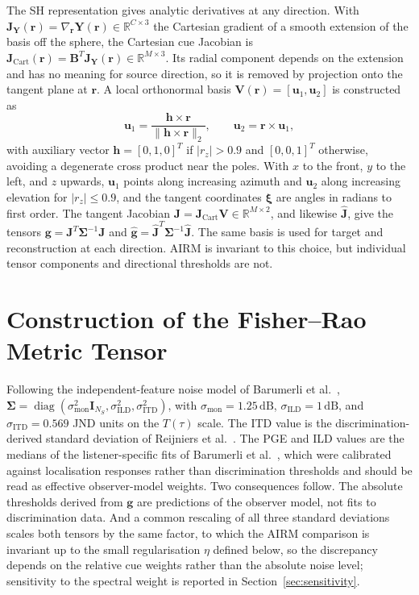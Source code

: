 \documentclass[journal]{IEEEtran}
\begin{document}
The SH representation gives analytic derivatives at any direction. With \(\mathbf{J}_{\mathbf{Y}}(\mathbf{r})=\nabla_{\mathbf{r}}\mathbf{Y}(\mathbf{r})\in \mathbb{R}^{C\times 3}\) the Cartesian gradient of a smooth extension of the basis off the sphere, the Cartesian cue Jacobian is \(\mathbf{J}_{\mathrm{Cart}}(\mathbf{r})=\mathbf{B}^{T}\mathbf{J}_{\mathbf{Y}}(\mathbf{r})\in\mathbb{R}^{M\times3}\). Its radial component depends on the extension and has no meaning for source direction, so it is removed by projection onto the tangent plane at \(\mathbf r\). A local orthonormal basis \(\mathbf{V}(\mathbf{r})=[\mathbf{u}_1,\mathbf{u}_2]\) is constructed as
\begin{equation}
\mathbf{u}_1 = \frac{\mathbf{h}\times \mathbf{r}}{\|\mathbf{h}\times \mathbf{r}\|_2},
\qquad
\mathbf{u}_2 = \mathbf{r} \times \mathbf{u}_1,
\end{equation}
with auxiliary vector \(\mathbf{h} = [0,1,0]^T\) if \(|r_z| > 0.9\) and \([0,0,1]^T\) otherwise, avoiding a degenerate cross product near the poles. With \(x\) to the front, \(y\) to the left, and \(z\) upwards, \(\mathbf u_1\) points along increasing azimuth and \(\mathbf u_2\) along increasing elevation for \(|r_z|\le0.9\), and the tangent coordinates \(\boldsymbol\xi\) are angles in radians to first order. The tangent Jacobian \(\mathbf{J}=\mathbf{J}_{\mathrm{Cart}}\mathbf{V}\in \mathbb{R}^{M\times2}\), and likewise \(\widehat{\mathbf J}\), give the tensors \(\mathbf g=\mathbf J^T\boldsymbol\Sigma^{-1}\mathbf J\) and \(\widehat{\mathbf g}=\widehat{\mathbf J}^T\boldsymbol\Sigma^{-1}\widehat{\mathbf J}\). The same basis is used for target and reconstruction at each direction. AIRM is invariant to this choice, but individual tensor components and directional thresholds are not.

\section{Construction of the Fisher--Rao Metric Tensor}\label{sec:fisher}
Following the independent-feature noise model of Barumerli et al.~\cite{Barumerli2023}, \(\boldsymbol\Sigma=\operatorname{diag}(\sigma_{\mathrm{mon}}^2\mathbf I_{N_S},\sigma_{\mathrm{ILD}}^2,\sigma_{\mathrm{ITD}}^2)\), with \(\sigma_{\mathrm{mon}}=1.25\,\mathrm{dB}\), \(\sigma_{\mathrm{ILD}}=1\,\mathrm{dB}\), and \(\sigma_{\mathrm{ITD}}=0.569\) JND units on the \(T(\tau)\) scale. The ITD value is the discrimination-derived standard deviation of Reijniers et al.~\cite{Reijniers2014}. The PGE and ILD values are the medians of the listener-specific fits of Barumerli et al.~\cite{Barumerli2023}, which were calibrated against localisation responses rather than discrimination thresholds and should be read as effective observer-model weights. Two consequences follow. The absolute thresholds derived from \(\mathbf g\) are predictions of the observer model, not fits to discrimination data. And a common rescaling of all three standard deviations scales both tensors by the same factor, to which the AIRM comparison is invariant up to the small regularisation \(\eta\) defined below, so the discrepancy depends on the relative cue weights rather than the absolute noise level; sensitivity to the spectral weight is reported in Section~\ref{sec:sensitivity}.
\end{document}
